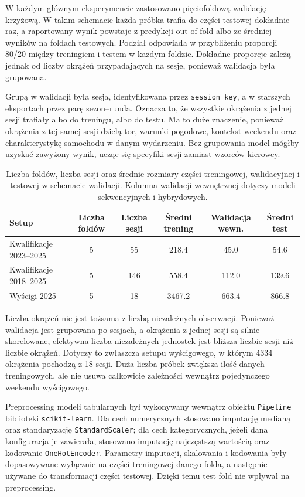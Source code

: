 \documentclass[printmode,pl]{mgr}
\begin{document}
W każdym głównym eksperymencie zastosowano pięciofoldową walidację krzyżową. W takim schemacie każda próbka trafia do części testowej dokładnie raz, a raportowany wynik powstaje z predykcji out-of-fold albo ze średniej wyników na foldach testowych. Podział odpowiada w przybliżeniu proporcji 80/20 między treningiem i testem w każdym foldzie. Dokładne proporcje zależą jednak od liczby okrążeń przypadających na sesje, ponieważ walidacja była grupowana.

Grupą w walidacji była sesja, identyfikowana przez \texttt{session\_key}, a w starszych eksportach przez parę sezon--runda. Oznacza to, że wszystkie okrążenia z jednej sesji trafiały albo do treningu, albo do testu. Ma to duże znaczenie, ponieważ okrążenia z tej samej sesji dzielą tor, warunki pogodowe, kontekst weekendu oraz charakterystykę samochodu w danym wydarzeniu. Bez grupowania model mógłby uzyskać zawyżony wynik, ucząc się specyfiki sesji zamiast wzorców kierowcy.

\begin{table}[H]
\centering
\small
\begin{tabular}{lccccc}
\toprule
Setup & Liczba foldów & Liczba sesji & Średni trening & Walidacja wewn. & Średni test \\
\midrule
Kwalifikacje 2023--2025 & 5 & 55 & 218.4 & 45.0 & 54.6 \\
Kwalifikacje 2018--2025 & 5 & 146 & 558.4 & 112.0 & 139.6 \\
Wyścigi 2025 & 5 & 18 & 3467.2 & 663.4 & 866.8 \\
\bottomrule
\end{tabular}
\caption{Liczba foldów, liczba sesji oraz średnie rozmiary części treningowej, walidacyjnej i testowej w schemacie walidacji. Kolumna walidacji wewnętrznej dotyczy modeli sekwencyjnych i hybrydowych.}
\label{tab:outer-fold-sizes}
\end{table}

Liczba okrążeń nie jest tożsama z liczbą niezależnych obserwacji. Ponieważ walidacja jest grupowana po sesjach, a okrążenia z jednej sesji są silnie skorelowane, efektywna liczba niezależnych jednostek jest bliższa liczbie sesji niż liczbie okrążeń. Dotyczy to zwłaszcza setupu wyścigowego, w którym 4334 okrążenia pochodzą z 18 sesji. Duża liczba próbek zwiększa ilość danych treningowych, ale nie usuwa całkowicie zależności wewnątrz pojedynczego weekendu wyścigowego.

Preprocessing modeli tabularnych był wykonywany wewnątrz obiektu \texttt{Pipeline} biblioteki \texttt{scikit-learn}. Dla cech numerycznych stosowano imputację medianą oraz standaryzację \texttt{StandardScaler}; dla cech kategorycznych, jeżeli dana konfiguracja je zawierała, stosowano imputację najczęstszą wartością oraz kodowanie \texttt{OneHotEncoder}. Parametry imputacji, skalowania i kodowania były dopasowywane wyłącznie na części treningowej danego folda, a następnie używane do transformacji części testowej. Dzięki temu test fold nie wpływał na preprocessing.
\end{document}
